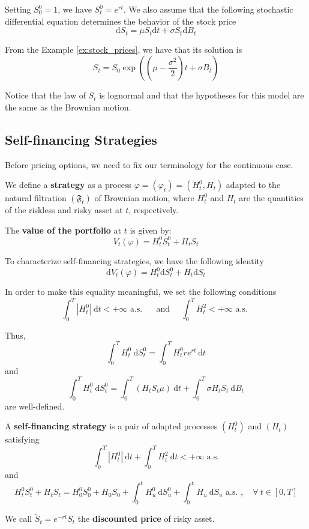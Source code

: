 Setting $S_0^0 = 1$, we have $S_t^0 = e^{rt}$. We also assume that the following stochastic differential equation determines the behavior of the stock price 
\[
    \mathrm{d} S_t = \mu S_t \mathrm{d}t + \sigma S_t \mathrm{d}B_t
\]

From the Example \ref{ex:stock_prices}, we have that its solution is
\begin{equation}\label{eq:black_scholes_solution}
    S_t = S_0 \exp \left(\left(\mu - \frac{\sigma^2}{2}\right)t + \sigma B_t \right)
\end{equation}

Notice that the law of $S_t$ is lognormal and that the hypotheses for this model are the same as the Brownian motion. 

\subsection{Self-financing Strategies}

Before pricing options, we need to fix our terminology for the continuous case.

\begin{definition}[Strategy]
    We define a \textbf{strategy} as a process $\varphi = (\varphi_t) = (H_t^0, H_t)$ adapted to the natural filtration $(\mathfrak{F}_t)$ of Brownian motion, where $H_t^0$ and $H_t$ are the quantities of the riskless and risky asset at $t$, respectively.
\end{definition}

\begin{definition}
    The \textbf{value of the portfolio} at $t$ is given by:
    \[
        V_t(\varphi) = H_t^0 S_t^0 + H_t S_t
    \]
\end{definition}

To characterize self-financing strategies, we have the following identity
\[
    \mathrm{d} V_t(\varphi) = H_t^0 \mathrm{d} S_t^0 + H_t \mathrm{d} S_t
\]

In order to make this equality meaningful, we set the following conditions
\[
    \int_0^T |H_t^0|~\mathrm{d}t < +\infty \text{ a.s. } \quad \text{ and } \quad \int_0^T H_t^2 < + \infty \text{ a.s. }
\]

Thus,
\[
    \int_0^T H_t^0~\mathrm{d}S_t^0 = \int_0^T H_t^0 re^{rt}~\mathrm{d}t
\]
and 
\[
    \int_0^T H_t^0 ~\mathrm{d}S_t^0 = \int_0^T (H_t S_t \mu)~\mathrm{d}t + \int_0^T \sigma H_t S_t ~\mathrm{d}B_t
\]
are well-defined.

\begin{definition}
    A \textbf{self-financing strategy} is a pair of adapted processes $(H_t^0)$ and $(H_t)$ satisfying
    \[
        \int_0^T |H_t^0| ~\mathrm{d}t + \int_0^T H_t^2 ~\mathrm{d}t < + \infty \text{ a.s.}
    \]
    and 
    \[
        H_t^0 S_t^0 + H_t S_t = H_0^0 S_0^0 + H_0 S_0 + \int_0^t H_u^0 ~\mathrm{d}S_u^0 + \int_0^t H_u ~\mathrm{d}S_u \text{ a.s. }, \quad \forall ~t \in [0,T]
    \]

    We call $\tilde{S}_t = e^{-rt} S_t$ the \textbf{discounted price} of risky asset.
\end{definition}

